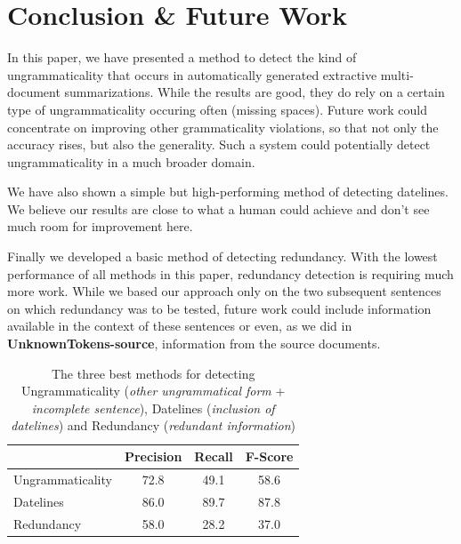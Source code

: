 \documentclass[a4paper,10pt]{scrartcl}
\theoremstyle{style}
\begin{document}
\section{Conclusion \& Future Work}
\label{conclusion}

In this paper, we have presented a method to detect the kind of ungrammaticality that occurs in automatically generated extractive multi-document summarizations. While the results are good, they do rely on a certain type of ungrammaticality occuring often (missing spaces). Future work could concentrate on improving other grammaticality violations, so that not only the accuracy rises, but also the generality. Such a system could potentially detect ungrammaticality in a much broader domain.

We have also shown a simple but high-performing method of detecting datelines. We believe our results are close to what a human could achieve and don't see much room for improvement here.

Finally we developed a basic method of detecting redundancy. With the lowest performance of all methods in this paper, redundancy detection is requiring much more work. While we based our approach only on the two subsequent sentences on which redundancy was to be tested, future work could include information available in the context of these sentences or even, as we did in \textbf{UnknownTokens-source}, information from the source documents.

\begin{table}
\begin{center}
\begin{tabular}{|l|c|c|c|}
  \hline
   & Precision & Recall & F-Score\\
  \hline
  Ungrammaticality & 72.8 & 49.1 & 58.6\\
  \hline
  Datelines & 86.0 & 89.7 & 87.8\\
  \hline
  Redundancy & 58.0 & 28.2 & 37.0\\
  \hline
  \end{tabular}
\end{center}
\label{eval_best}
\caption{The three best methods for detecting Ungrammaticality (\textit{other ungrammatical form} + \textit{incomplete sentence}), Datelines (\textit{inclusion of datelines}) and Redundancy (\textit{redundant information})}
\end{table}
\end{document}
